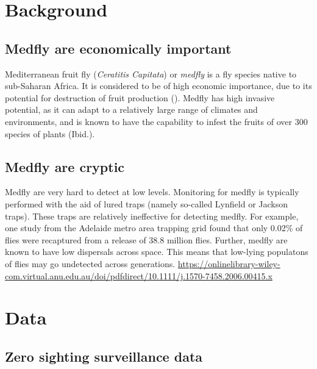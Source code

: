 \documentclass[
]{book}
\begin{document}
\hypertarget{background}{%
\section{Background}\label{background}}

\hypertarget{medfly-are-economically-important}{%
\subsection{Medfly are economically important}\label{medfly-are-economically-important}}

Mediterranean fruit fly (\emph{Ceratitis Capitata}) or \emph{medfly} is a fly species native to sub-Saharan Africa. It is considered to be of high economic importance, due to its potential for destruction of fruit production (\citet{sciarretta2018}). Medfly has high invasive potential, as it can adapt to a relatively large range of climates and environments, and is known to have the capability to infest the fruits of over 300 species of plants (Ibid.).

\hypertarget{medfly-are-cryptic}{%
\subsection{Medfly are cryptic}\label{medfly-are-cryptic}}

Medfly are very hard to detect at low levels. Monitoring for medfly is typically performed with the aid of lured traps (namely so-called Lynfield or Jackson traps). These traps are relatively ineffective for detecting medfly. For example, one study from the Adelaide metro area trapping grid found that only 0.02\% of flies were recaptured from a release of 38.8 million flies. Further, medfly are known to have low dispersals across space. This means that low-lying populatons of flies may go undetected across generations. \url{https://onlinelibrary-wiley-com.virtual.anu.edu.au/doi/pdfdirect/10.1111/j.1570-7458.2006.00415.x}

\hypertarget{data}{%
\section{Data}\label{data}}

\hypertarget{zero-sighting-surveillance-data}{%
\subsection{Zero sighting surveillance data}\label{zero-sighting-surveillance-data}}
\end{document}
